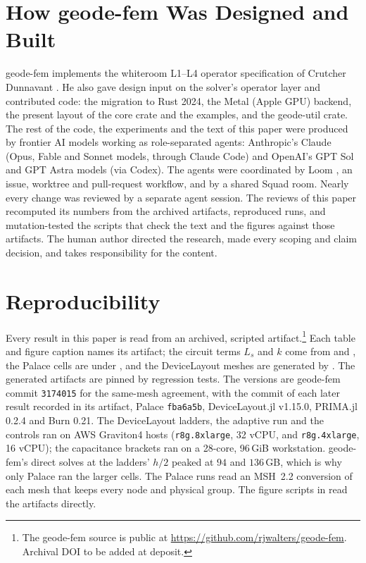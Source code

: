 \documentclass{anvil-paper}
\begin{document}
\section{How geode-fem Was Designed and Built}
\label{sec:built}

geode-fem implements the whiteroom L1--L4 operator specification of
Crutcher Dunnavant \citep{dunnavant2026whiteroom}. He also gave design
input on the solver's operator layer and contributed code: the migration to
Rust 2024, the Metal (Apple GPU) backend, the present layout of the core
crate and the examples, and the geode-util crate. The rest of the code, the
experiments and the text of this paper were produced by frontier AI models
working as role-separated agents: Anthropic's Claude (Opus, Fable and
Sonnet models, through Claude Code) and OpenAI's GPT Sol and GPT Astra
models (via Codex). The agents were coordinated by Loom \citep{loom}, an
issue, worktree and pull-request workflow, and by a shared Squad room.
Nearly every change was reviewed by a separate agent session. The reviews
of this paper recomputed its numbers from the archived artifacts,
reproduced runs, and mutation-tested the scripts that check the text and
the figures against those artifacts. The human author directed the
research, made every scoping and claim decision, and takes responsibility
for the content.

\section{Reproducibility}
\label{sec:repro}

Every result in this paper is read from an archived, scripted
artifact.\footnote{The geode-fem source is public at
\url{https://github.com/rjwalters/geode-fem}. Archival DOI to be added at
deposit.}
Each table and figure caption names its artifact; the circuit terms $L_s$
and $k$ come from  and
, the Palace cells are under
, and the DeviceLayout meshes are
generated by . The
generated artifacts are pinned by regression tests. The versions are geode-fem commit
\texttt{3174015} for the same-mesh agreement, with the commit of each later
result recorded in its artifact, Palace \texttt{fba6a5b}, DeviceLayout.jl
v1.15.0, PRIMA.jl 0.2.4 and Burn 0.21. The DeviceLayout ladders, the
adaptive run and the controls ran on AWS Graviton4 hosts
(\texttt{r8g.8xlarge}, 32 vCPU, and \texttt{r8g.4xlarge}, 16 vCPU); the
capacitance brackets ran on a 28-core, 96\,GiB workstation. geode-fem's
direct solves at the ladders' $h/2$ peaked at $94$ and $136$\,GB, which is
why only Palace ran the larger cells. The Palace runs read an MSH~2.2
conversion of each mesh that keeps every node and physical group. The figure scripts in
 read the artifacts directly.
\end{document}

